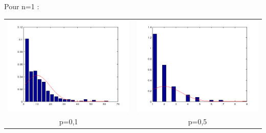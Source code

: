 \documentclass{article}
\begin{document}
\bigskip
Pour n=1 : \\
\begin{tabular}{c c}
	\includegraphics[scale=0.5]{graph/n1p1.png} & 
	\includegraphics[scale=0.5]{graph/n1p5.png} \\
	p=0,1 &	p=0,5
\end{tabular}\\
\end{document}
